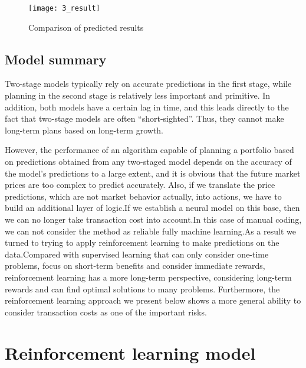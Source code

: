 \documentclass{mcmthesis}
\begin{document}
\begin{figure}[h]
  \centering
  \texttt{[image: 3\_result]}
  \caption{Comparison of predicted results}
  \label{fig:prediction}
\end{figure}
\subsection{Model summary}


Two-stage models typically rely on accurate predictions in the first stage, while planning in the second stage is relatively less important and primitive. In addition, both models have a certain lag in time, and this leads directly to the fact that two-stage models are often ``short-sighted''. Thus, they cannot make long-term plans based on long-term growth.

However, the performance of an algorithm capable of planning a portfolio based on predictions obtained from any two-staged model depends on the accuracy of the model's predictions to a large extent, and it is obvious that the future market prices are too complex to predict accurately. Also, if we translate the price predictions, which are not market behavior actually, into actions, we have to build an additional layer of logic.If we establish a neural model on this base, then we can no longer take transaction cost into account.In this case of manual coding, we can not consider the method as reliable fully machine learning.As a result we turned to trying to apply reinforcement learning to make predictions on the data.Compared with supervised learning that can only consider one-time problems, focus on short-term benefits and consider immediate rewards, reinforcement learning has a more long-term perspective, considering long-term rewards and can find optimal solutions to many problems. Furthermore, the reinforcement learning approach we present below shows a more general ability to consider transaction costs as one of the important risks.




\section{Reinforcement learning model}
\end{document}
